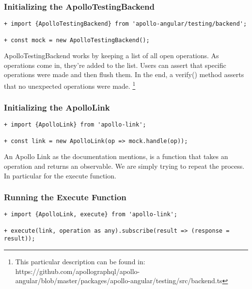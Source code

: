 \subsubsection { Initializing the ApolloTestingBackend }
\begin{lstlisting}
+ import {ApolloTestingBackend} from 'apollo-angular/testing/backend';

+ const mock = new ApolloTestingBackend();
\end{lstlisting}

ApolloTestingBackend works by keeping a list of all open operations.
As operations come in, they're added to the list. Users can assert that specific
operations were made and then flush them. In the end, a verify() method asserts
that no unexpected operations were made.
\footnote{This particular description can be found in: https://github.com/apollographql/apollo-angular/blob/master/packages/apollo-angular/testing/src/backend.ts}

\subsubsection { Initializing the ApolloLink }

\begin{lstlisting}
+ import {ApolloLink} from 'apollo-link';

+ const link = new ApolloLink(op => mock.handle(op));
\end{lstlisting}

An Apollo Link as the documentation mentions, is a function that takes an
operation and returns an observable. We are simply trying to repeat the process.
In particular for the execute function.

\subsubsection { Running the Execute Function }
\begin{lstlisting}
+ import {ApolloLink, execute} from 'apollo-link';

+ execute(link, operation as any).subscribe(result => (response = result));
\end{lstlisting}
